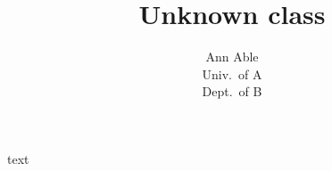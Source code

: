 \documentclass{nosuchclass}
\begin{document}
\title{Unknown class}
\author{Ann Able \\ Univ.\ of A \\ Dept.\ of B}
\date{}
\maketitle
text
\end{document}
